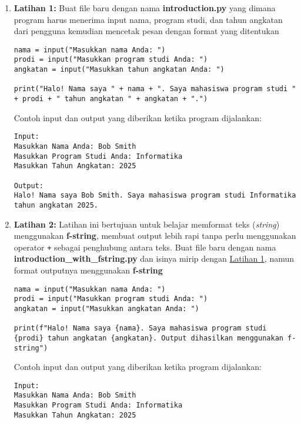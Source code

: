 \begin{enumerate}
\item \label{sec:first-exercise} \textbf{Latihan 1:} Buat file baru dengan nama \textbf{introduction.py} yang dimana program harus menerima input nama, program studi, dan tahun angkatan dari pengguna kemudian mencetak pesan dengan format yang ditentukan
\begin{lstlisting}[style=PythonStyle, caption={Latihan 1}]
nama = input("Masukkan nama Anda: ")
prodi = input("Masukkan program studi Anda: ")
angkatan = input("Masukkan tahun angkatan Anda: ")

print("Halo! Nama saya " + nama + ". Saya mahasiswa program studi " + prodi + " tahun angkatan " + angkatan + ".")
\end{lstlisting}

Contoh input dan output yang diberikan ketika program dijalankan:

\begin{verbatim}
Input:
Masukkan Nama Anda: Bob Smith
Masukkan Program Studi Anda: Informatika
Masukkan Tahun Angkatan: 2025

Output:
Halo! Nama saya Bob Smith. Saya mahasiswa program studi Informatika tahun angkatan 2025.
\end{verbatim}

\item \textbf{Latihan 2:} Latihan ini bertujuan untuk belajar memformat teks (\textit{string}) menggunakan \textbf{f-string}, membuat output lebih rapi tanpa perlu menggunakan operator \texttt{+} sebagai penghubung antara teks. Buat file baru dengan nama \textbf{introduction_with_fstring.py} dan isinya mirip dengan \hyperref[sec:first-exercise]{Latihan 1}, namun format outputnya menggunakan \textbf{f-string}

\begin{lstlisting}[style=PythonStyle, caption={Latihan 2}]
nama = input("Masukkan nama Anda: ")
prodi = input("Masukkan program studi Anda: ")
angkatan = input("Masukkan angkatan Anda: ")

print(f"Halo! Nama saya {nama}. Saya mahasiswa program studi {prodi} tahun angkatan {angkatan}. Output dihasilkan menggunakan f-string")
\end{lstlisting}

Contoh input dan output yang diberikan ketika program dijalankan:

\begin{verbatim}
Input:
Masukkan Nama Anda: Bob Smith
Masukkan Program Studi Anda: Informatika
Masukkan Tahun Angkatan: 2025


\end{verbatim}
\end{enumerate}
